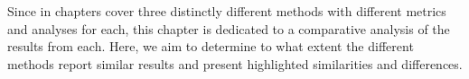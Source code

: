Since in chapters  cover three distinctly different methods with different metrics and analyses for each, this chapter is dedicated to a comparative analysis of the results from each. Here, we aim to determine to what extent the different methods report similar results and present highlighted similarities and differences.